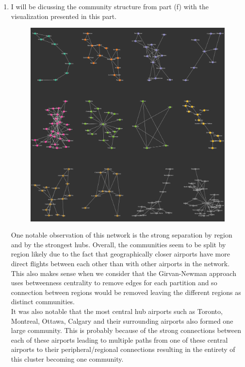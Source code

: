 \documentclass{article}
\begin{document}
\begin{enumerate}[label=(\alph*), left=10pt, itemsep=10pt]
        \item \begin{minipage}[t]{0.9\textwidth}
            I will be dicussing the community structure from part (f) with the visualization
            presented in this part.
            \begin{figure}[H]
                \centering
                \includegraphics[width=1\textwidth, height=0.5\textheight]{./1g.png}
            \end{figure}
            One notable observation of this network is the strong separation by region and by 
            the strongest hubs. Overall, the communities seem to be split by region likely due
            to the fact that geographically closer airports have more direct flights between
            each other than with other airports in the network. This also makes sense when we
            consider that the Girvan-Newman approach uses betweenness centrality to remove edges
            for each partition and so connection between regions would be removed leaving the
            different regions as distinct communities.\\

            It was also notable that the most central hub airports such as Toronto, Montreal,
            Ottawa, Calgary and their surrounding airports also formed one large community. This is
            probably because of the strong connections between each of these airports leading to
            multiple paths from one of these central airports to their peripheral/regional
            connections resulting in the entirety of this cluster becoming one community.\\


\end{minipage}
\end{enumerate}
\end{document}
